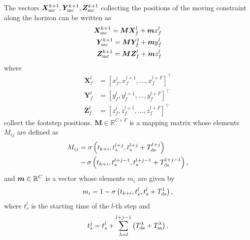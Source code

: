The vectors $\bm{X}_{\rm mc}^{k+1}, \bm{Y}_{\rm mc}^{k+1}, \bm{Z}_{\rm mc}^{k+1}$
collecting the positions of the moving constraint along the horizon
can be written as
\begin{equation}
    \begin{aligned}
        \bm{X}_{\rm mc}^{k+1} = \bm{M} \bm{X}_f^l + \bm{m}x_f^l \\
        \bm{Y}_{\rm mc}^{k+1} = \bm{M} \bm{Y}_f^l + \bm{m}y_f^l \\
        \bm{Z}_{\rm mc}^{k+1} = \bm{M} \bm{Z}_f^l + \bm{m}z_f^l
    \end{aligned}
    \label{eq:FAPA:mapping}
\end{equation}
where
\begin{equation*}
    \begin{aligned}
        \bm{X}_{f}^{l} &= \left[x_{f}^{l}, x_{f}^{l+1}, \dots, x_{f}^{l+F}\right]^\top \\
        \bm{Y}_{f}^{l} &= \left[y_{f}^{l}, y_{f}^{l+1}, \dots, y_{f}^{l+F}\right]^\top \\
        \bm{Z}_{f}^{l} &= \left[z_{f}^{l}, z_{f}^{l+1}, \dots, z_{f}^{l+F}\right]^\top
    \end{aligned}
\end{equation*}
collect the footstep positions.
$\bm{M}\in\mathbb{R}^{C\times F}$ is a mapping matrix whose elements
$M_{ij}$ are defined as
\begin{equation}\begin{split}
M_{ij} &= \sigma\left(t_{k+i}, t_s^{l+j},t_s^{l+j}+T_{\rm ds}^{l+j}\right)\\ &- \sigma\left(t_{k+i}, t_s^{l+j-1},t_s^{l+j-1}+T_{\rm ds}^{l+j-1}\right),
\end{split}\end{equation}
and ${\bm{m}}\in\mathbb{R}^{C}$ is a vector whose elements $m_i$ are given by
\begin{equation*}
m_{i} = 1 - \sigma\left(t_{k+i}, t_s^{l},t_s^{l}+T_{\rm ds}^{1}\right),
\end{equation*}
where $t_s^l$ is the starting time of the $l$-th step and
\begin{equation*}
    t^j_s = t^l_s + \sum^{l+j-1}_{\lambda=l} \left(T_{\rm ds}^\lambda + T_{\rm ss}^\lambda\right).
\end{equation*}

